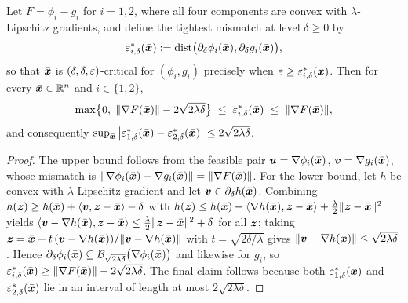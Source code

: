 \begin{proposition}
\label{prop:vanishing-decomposition-dependence}
Let $F=\phi_i-g_i$ for $i=1,2$, where all four components are convex
with $\lambda$-Lipschitz gradients, and define the tightest mismatch at
level $\delta\ge0$ by
\[
    \varepsilon^{*}_{i,\delta}(\bar{\bm{x}})
    :=\operatorname{dist}\bigl(\partial_\delta\phi_i(\bar{\bm{x}}),
    \partial_\delta g_i(\bar{\bm{x}})\bigr),
\]
so that $\bar{\bm{x}}$ is $(\delta,\delta,\varepsilon)$-critical for $(\phi_i,g_i)$
precisely when $\varepsilon\ge\varepsilon^{*}_{i,\delta}(\bar{\bm{x}})$. Then for every
$\bar{\bm{x}}\in\mathbb{R}^n$ and $i\in\{1,2\}$,
\[
    \max\bigl\{0,\;\|\nabla F(\bar{\bm{x}})\|-2\sqrt{2\lambda\delta}\bigr\}
    \;\le\;\varepsilon^{*}_{i,\delta}(\bar{\bm{x}})\;\le\;\|\nabla F(\bar{\bm{x}})\|,
\]
and consequently
$\sup_{\bar{\bm{x}}}\,
\bigl|\varepsilon^{*}_{1,\delta}(\bar{\bm{x}})-\varepsilon^{*}_{2,\delta}(\bar{\bm{x}})\bigr|
\le2\sqrt{2\lambda\delta}$.
\end{proposition}

\begin{proof}
The upper bound follows from the feasible pair
$\bm{u}=\nabla\phi_i(\bar{\bm{x}})$, $\bm{v}=\nabla g_i(\bar{\bm{x}})$, whose mismatch
is $\|\nabla\phi_i(\bar{\bm{x}})-\nabla g_i(\bar{\bm{x}})\|=\|\nabla F(\bar{\bm{x}})\|$.
For the lower bound, let $h$ be convex with $\lambda$-Lipschitz
gradient and let $\bm{v}\in\partial_\delta h(\bar{\bm{x}})$. Combining
$h(\bm{z})\ge h(\bar{\bm{x}})+\langle\bm{v},\bm{z}-\bar{\bm{x}}\rangle-\delta$ with
$h(\bm{z})\le h(\bar{\bm{x}})+\langle\nabla h(\bar{\bm{x}}),\bm{z}-\bar{\bm{x}}\rangle
+\frac{\lambda}{2}\|\bm{z}-\bar{\bm{x}}\|^2$ yields
$\langle\bm{v}-\nabla h(\bar{\bm{x}}),\bm{z}-\bar{\bm{x}}\rangle
\le\frac{\lambda}{2}\|\bm{z}-\bar{\bm{x}}\|^2+\delta$ for all $\bm{z}$; taking
$\bm{z}=\bar{\bm{x}}+t\,(\bm{v}-\nabla h(\bar{\bm{x}}))/\|\bm{v}-\nabla h(\bar{\bm{x}})\|$ with
$t=\sqrt{2\delta/\lambda}$ gives
$\|\bm{v}-\nabla h(\bar{\bm{x}})\|\le\sqrt{2\lambda\delta}$. Hence
$\partial_\delta\phi_i(\bar{\bm{x}})\subseteq
\mathcal{B}_{\sqrt{2\lambda\delta}}\bigl(\nabla\phi_i(\bar{\bm{x}})\bigr)$
and likewise for $g_i$, so
$\varepsilon^{*}_{i,\delta}(\bar{\bm{x}})
\ge\|\nabla F(\bar{\bm{x}})\|-2\sqrt{2\lambda\delta}$. The final claim
follows because both $\varepsilon^{*}_{1,\delta}(\bar{\bm{x}})$ and
$\varepsilon^{*}_{2,\delta}(\bar{\bm{x}})$ lie in an interval of length at most
$2\sqrt{2\lambda\delta}$.
\end{proof}

